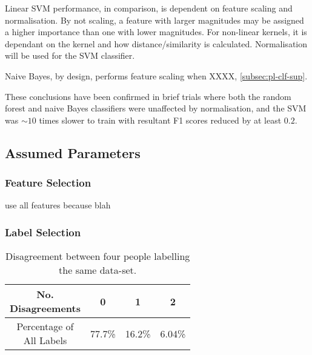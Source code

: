             Linear SVM performance, in comparison, is dependent on feature scaling and normalisation. By not scaling, a feature with larger magnitudes may be assigned a higher importance than one with lower magnitudes. For non-linear kernels, it is dependant on the kernel and how distance/similarity is calculated. Normalisation will be used for the SVM classifier.
            
            Naive Bayes, by design, performs feature scaling when XXXX, \ref{subsec:pl-clf-sup}. 
            
            These conclusions have been confirmed in brief trials where both the random forest and naive Bayes classifiers were unaffected by normalisation, and the SVM was $\sim10$ times slower to train with resultant F1 scores reduced by at least $0.2$.
    
         
    \subsection{Assumed Parameters}
    \label{subsec:exp-clf-ass}       
        \subsubsection{Feature Selection}
        \label{subsubsec:exp-clf-ass-featsel}
            use all features because blah
        
        \subsubsection{Label Selection}
            \label{subsubsec:exp-clf-ass-label}
            \begin{wraptable}{r}{0.4\textwidth}
                \scriptsize
                \singlespacing
                \centering
                    \begin{tabular}{ |c|c|c|c| } 
                        \hline
                        \specialcell{No.\\ Disagreements} & 0 & 1 & 2 \\ 
                        \hline
                        \specialcell{Percentage of \\All Labels} & 77.7\% & 16.2\% & 6.04\% \\ 
                        \hline
                    \end{tabular}
                \caption{Disagreement between four people labelling the same data-set.}
                \label{fig:exp-clf-ass-label-agree}
            \end{wraptable}
        
